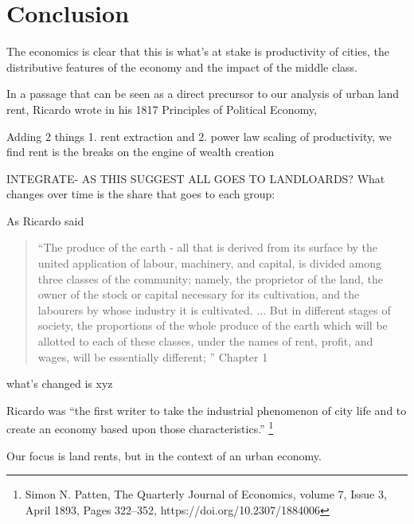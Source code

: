 

\chapter{Conclusion}


The economics is clear that this is what's at stake is productivity of cities, the distributive features of the economy and the impact of the middle class.

In a passage that can be seen as a direct precursor to our analysis of urban land rent, Ricardo  wrote in his 1817 Principles of Political Economy, %

Adding 2 things 1. rent extraction and 2. power law scaling of productivity, we find rent is the breaks on the engine of wealth creation

INTEGRATE- AS THIS SUGGEST ALL GOES TO LANDLOARDS?
What changes over time is the share that goes to each group:

As Ricardo said

\begin{quotation}   
 “The produce of the earth - all that is derived from its surface by the united application of labour, machinery, and capital, is divided among three classes of the community; namely, the proprietor of the land, the owner of the stock or capital necessary for its cultivation, and the labourers by whose industry it is cultivated. ...  But in different stages of society, the proportions of the whole produce of the earth which will be allotted to each of these classes, under the names of rent, profit, and wages, will be essentially different; ”  Chapter 1
\end{quotation}

what's changed is xyz

Ricardo was ``the first writer to take the industrial phenomenon of city life and to create an economy based upon those characteristics.''  \footnote{Simon N. Patten,  The Quarterly Journal of Economics, volume 7, Issue 3, April 1893, Pages 322–352, https://doi.org/10.2307/1884006 }  

Our focus is land rents, but in the context of an urban economy. 






